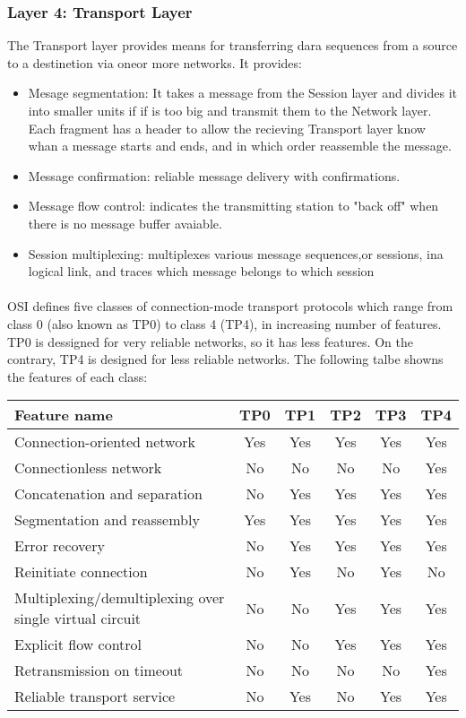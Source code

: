 \documentclass[12pt,a4paper]{report}
\begin{document}
\subsubsection{Layer 4: Transport Layer}
The Transport layer provides means for transferring dara sequences from a source to a destinetion via oneor more networks. It provides:
\begin{itemize}
\item Mesage segmentation: It takes a message from the Session layer and divides it into smaller units if if is too big and transmit them to the Network layer. Each fragment has a header to allow the recieving Transport layer know whan a message starts and ends, and in which order reassemble the message.
\item Message confirmation: reliable message delivery with confirmations.
\item Message flow control: indicates the transmitting station to "back off" when there is no message buffer avaiable.
\item Session multiplexing: multiplexes various message sequences,or sessions, ina logical link, and traces which message belongs to which session
\end{itemize}
\paragraph{}OSI defines five classes of connection-mode transport protocols which range from class 0 (also known as TP0) to class 4 (TP4), in increasing number of features. TP0 is dessigned for very reliable networks, so it has less features. On the contrary, TP4 is designed for less reliable networks. The following talbe showns the features of each class:
\\
\begin{center}
\begin{tabular}{|l|c|c|c|c|c|}
\hline 
\textbf{Feature name} & \textbf{TP0} & \textbf{TP1} & \textbf{TP2} & \textbf{TP3} & \textbf{TP4} \\ 
\hline 
Connection-oriented network & Yes & Yes & Yes & Yes & Yes \\ 
\hline 
Connectionless network & No & No & No & No & Yes \\ 
\hline 
Concatenation and separation & No & Yes & Yes & Yes & Yes \\ 
\hline 
Segmentation and reassembly & Yes & Yes & Yes & Yes & Yes \\ 
\hline 
Error recovery & No & Yes & Yes & Yes & Yes \\ 
\hline 
Reinitiate connection & No & Yes & No & Yes & No \\ 
\hline 
Multiplexing/demultiplexing over single virtual circuit & No & No & Yes & Yes & Yes \\ 
\hline 
Explicit flow control & No & No & Yes & Yes & Yes \\ 
\hline 
Retransmission on timeout & No & No & No & No & Yes \\ 
\hline 
Reliable transport service & No & Yes & No & Yes & Yes \\ 
\hline 
\end{tabular}
\end{center} 
\end{document}

